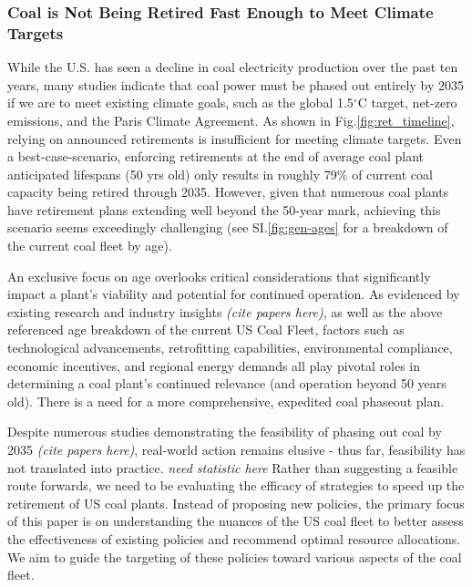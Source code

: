 \subsubsection*{Coal is Not Being Retired Fast Enough to Meet Climate Targets}
While the U.S. has seen a decline in coal electricity production over the past ten years, many studies indicate that coal power must be phased out entirely by 2035 if we are to meet existing climate goals, such as the global 1.5$^\circ$C target, 
net-zero emissions, 
and the Paris Climate Agreement. As shown in Fig.\ref{fig:ret_timeline}, relying on announced retirements is insufficient for meeting climate targets.
Even a best-case-scenario, enforcing retirements at the end of average coal plant anticipated lifespans (50 yrs old) only results in roughly 79\% of current coal capacity being retired through 2035. 
However, given that numerous coal plants have retirement plans extending well beyond the 50-year mark, achieving this scenario seems exceedingly challenging (see SI.\ref{fig:gen-ages} for a breakdown of the current coal fleet by age). 

An exclusive focus on age overlooks critical considerations that significantly impact a plant's viability and potential for continued operation. 
As evidenced by existing research and industry insights \textit{(cite papers here)}, as well as the above referenced age breakdown of the current US Coal Fleet,
factors such as technological advancements, retrofitting capabilities, environmental compliance, economic incentives, and regional energy demands all play pivotal roles in determining a coal plant's continued relevance (and operation beyond 50 years old).
There is a need for a more comprehensive, expedited coal phaseout plan. 

Despite numerous studies demonstrating the feasibility of phasing out coal by 2035 \textit{(cite papers here)}, 
real-world action remains elusive - thus far, feasibility has not translated into practice. \textit{need statistic here} 
Rather than suggesting a feasible route forwards, we need to be evaluating the efficacy of strategies to speed up the retirement of US coal plants. 
Instead of proposing new policies, the primary focus of this paper is on understanding the nuances of the US coal fleet to better assess the effectiveness 
of existing policies and recommend optimal resource allocations. We aim to guide the targeting of these policies toward various aspects of the coal fleet.




